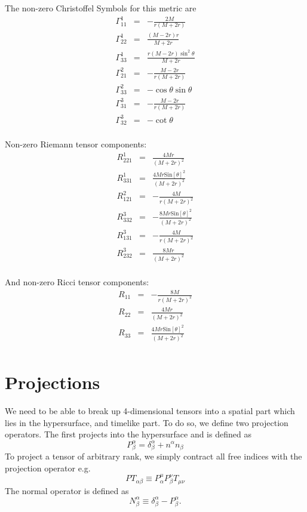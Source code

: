 \documentclass{article}
\begin{document}
The non-zero Christoffel Symbols for this metric are 
\begin{equation} \begin{array}{ccl}
\Gamma^1_{11} &=& -\frac{2M}{r(M+2r)}\\
\Gamma^1_{22} &=& \frac{(M-2r)r}{M+2r}\\
\Gamma^1_{33} &=& \frac{r(M-2r)\sin^2\theta}{M+2r}\\
\Gamma^2_{21} &=& -\frac{M-2r}{r(M+2r)}\\
\Gamma^2_{33} &=& -\cos\theta\sin\theta\\
\Gamma^3_{31} &=& -\frac{M-2r}{r(M+2r)}\\
\Gamma^3_{32} &=& -\cot\theta\\
\end{array}\end{equation}\label{Christoffel3}

Non-zero Riemann tensor components:
\begin{equation} \begin{array}{ccl}
 R^1_{221}  &=& \frac{4 M r}{(M+2 r)^2} \\
 R^1_{331}  &=& \frac{4 M r \text{Sin}[\theta ]^2}{(M+2 r)^2} \\
 R^2_{121}  &=& -\frac{4 M}{r (M+2 r)^2} \\
 R^3_{332}  &=& -\frac{8 M r \text{Sin}[\theta ]^2}{(M+2 r)^2} \\
 R^3_{131}  &=& -\frac{4 M}{r (M+2 r)^2} \\
 R^3_{232}  &=& \frac{8 M r}{(M+2 r)^2}\\
\end{array}\end{equation}\label{Riemann3}

And non-zero Ricci tensor components:
\begin{equation}\begin{array}{ccl}
 R_{11} &=& -\frac{8 M}{r (M+2 r)^2} \\
 R_{22} &=& \frac{4 M r}{(M+2 r)^2} \\
 R_{33} &=& \frac{4 M r \text{Sin}[\theta ]^2}{(M+2 r)^2}\\
\end{array} \end{equation}\label{Ricci3}

\section{Projections}
We need to be able to break up 4-dimensional tensors into a spatial part which lies in the hypersurface, and timelike part. To do so, we define two projection operators. The first projects into the hypersurface and is defined as 
\[ P^\alpha _\beta = \delta ^\alpha _\beta + n^\alpha n_\beta \]
To project a tensor of arbitrary rank, we simply contract all free indices with the projection operator e.g.
\[ PT_{\alpha \beta} \equiv P^\mu_\alpha P^\nu_\beta T_{\mu \nu} \]
The normal operator is defined as 
\[ N^\alpha_\beta \equiv \delta^\alpha_\beta - P^\alpha_\beta. \]
\end{document}
